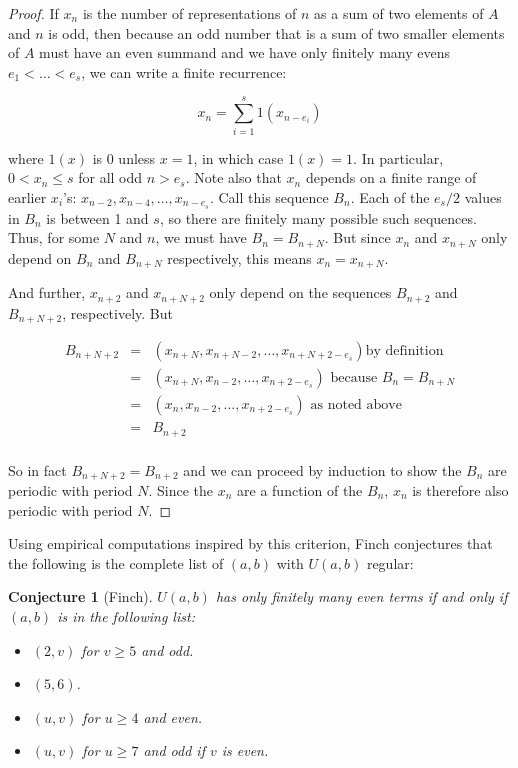 \documentclass{article}
\newtheorem{conjecture}[theorem]{Conjecture}
\theoremstyle{definition}
\theoremstyle{remark}
\numberwithin{equation}{section}
\begin{document}
\begin{proof}

  If $x_n$ is the number of representations of $n$ as a sum of two
  elements of $A$ and $n$ is odd, then because an odd number that is a
  sum of two smaller elements of $A$ must have an even summand and we
  have only finitely many evens $e_1 < \ldots < e_s$, we can write a
  finite recurrence:

  \[x_n = \sum_{i=1}^s 1(x_{n-e_i})\]
  
  where $1(x)$ is 0 unless $x = 1$, in which case $1(x) = 1$.  In
  particular, $0 < x_n \leq s$ for all odd $n > e_s$.  Note also that
  $x_n$ depends on a finite range of earlier $x_i$'s:
  $x_{n-2}, x_{n-4}, \ldots, x_{n-e_s}$.  Call this sequence $B_n$.
  Each of the $e_s/2$ values in $B_n$ is between 1 and $s$, so there
  are finitely many possible such sequences.  Thus, for some $N$ and
  $n$, we must have $B_n = B_{n+N}$.  But since $x_n$ and $x_{n+N}$
  only depend on $B_n$ and $B_{n+N}$ respectively, this means
  $x_n = x_{n+N}$.

  And further, $x_{n+2}$ and $x_{n+N+2}$ only depend on the sequences
  $B_{n+2}$ and $B_{n+N+2}$, respectively.  But 

  \begin{eqnarray*}
    B_{n+N+2} &=& (x_{n+N}, x_{n+N-2}, \ldots, x_{n+N+2-e_s}) \text{
    by definition}\\
    &=& (x_{n+N}, x_{n-2}, \ldots, x_{n+2-e_s}) \text{ because $B_n
                                                  = B_{n+N}$}\\
    &=& (x_{n}, x_{n-2}, \ldots, x_{n+2-e_s}) \text{ as noted
                                                above}\\
              &=& B_{n+2}\\
  \end{eqnarray*}

  So in fact $B_{n+N+2} = B_{n+2}$ and we can proceed by induction to
  show the $B_n$ are periodic with period $N$.  Since the $x_n$ are a
  function of the $B_n$, $x_n$ is therefore also periodic with period
  $N$.
\end{proof}

Using empirical computations inspired by this criterion, Finch
conjectures \cite{finch:em1992} that the following is the complete
list of $(a,b)$ with $U(a,b)$ regular:

\begin{conjecture}[Finch]
  $U(a,b)$ has only finitely many even terms if and only if $(a,b)$ is
  in the following list:

\begin{itemize}
\item $(2,v)$ for $v \geq 5$ and odd.
\item $(5,6)$.
\item $(u,v)$ for $u \geq 4$ and even.
\item $(u,v)$ for $u \geq 7$ and odd if $v$ is even.
\end{itemize}
\end{conjecture}
\end{document}
